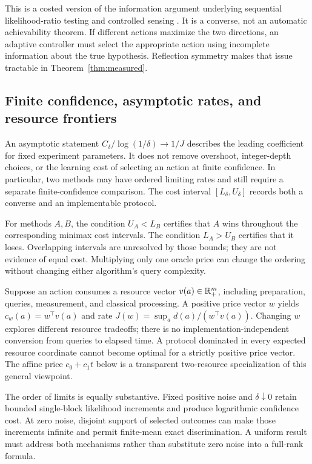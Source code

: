This is a costed version of the information argument underlying
sequential likelihood-ratio testing and controlled sensing
\citep{wald1945,chernoff1959,nitinawarat2015}. It is a converse, not an
automatic achievability theorem. If different actions maximize the two
directions, an adaptive controller must select the appropriate action
using incomplete information about the true hypothesis. Reflection
symmetry makes that issue tractable in Theorem~\ref{thm:measured}.

\subsection{Finite confidence, asymptotic rates, and resource frontiers}
An asymptotic statement $C_\delta/\log(1/\delta)\to1/J$ describes
the leading coefficient for fixed experiment parameters. It does not
remove overshoot, integer-depth choices, or the learning cost of selecting
an action at finite confidence. In particular, two methods may have
ordered limiting rates and still require a separate finite-confidence
comparison. The cost interval $[L_\delta,U_\delta]$ records both a
converse and an implementable protocol.

For methods $A,B$, the condition $U_A<L_B$ certifies that $A$ wins
throughout the corresponding minimax cost intervals. The condition
$L_A>U_B$ certifies that it loses. Overlapping intervals are unresolved
by those bounds; they are not evidence of equal cost. Multiplying only
one oracle price can change the ordering without changing either
algorithm's query complexity.

Suppose an action consumes a resource vector $v(a)\in\mathbb R_+^m$, including
preparation, queries, measurement, and classical processing. A positive
price vector $w$ yields $c_w(a)=w^\top v(a)$ and rate
$J(w)=\sup_a d(a)/(w^\top v(a))$. Changing $w$ explores different
resource tradeoffs; there is no implementation-independent conversion
from queries to elapsed time. A protocol dominated in every expected
resource coordinate cannot become optimal for a strictly positive price
vector. The affine price $c_0+c_1t$ below is a transparent two-resource
specialization of this general viewpoint.

The order of limits is equally substantive. Fixed positive noise and
$\delta\downarrow 0$ retain bounded single-block likelihood increments
and produce logarithmic confidence cost. At zero noise, disjoint support
of selected outcomes can make those increments infinite and permit
finite-mean exact discrimination. A uniform result must address both
mechanisms rather than substitute zero noise into a full-rank formula.
